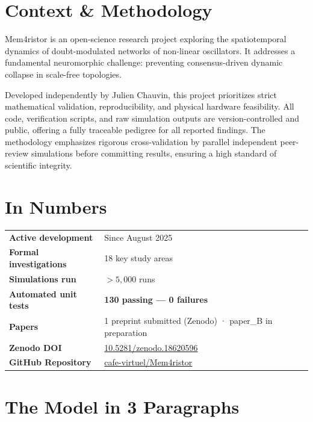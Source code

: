 \documentclass[11pt, a4paper]{article}
\newcommand{\result}[1]{\textbf{\color{positive}#1}}
\begin{document}
\section{Context \& Methodology}

Mem4ristor is an open-science research project exploring the spatiotemporal dynamics of doubt-modulated networks of non-linear oscillators. It addresses a fundamental neuromorphic challenge: preventing consensus-driven dynamic collapse in scale-free topologies.

Developed independently by Julien Chauvin, this project prioritizes strict mathematical validation, reproducibility, and physical hardware feasibility. All code, verification scripts, and raw simulation outputs are version-controlled and public, offering a fully traceable pedigree for all reported findings. The methodology emphasizes rigorous cross-validation by parallel independent peer-review simulations before committing results, ensuring a high standard of scientific integrity.

\section{In Numbers}

\begin{center}
\renewcommand{\arraystretch}{1.25}
\begin{tabular}{p{4.5cm} p{9cm}}
\toprule
\textbf{Active development} & Since August 2025 \\
\textbf{Formal investigations} & 18 key study areas \\
\textbf{Simulations run} & $> 5{,}000$ runs \\
\textbf{Automated unit tests} & \result{130 passing --- 0 failures} \\
\textbf{Papers} & 1 preprint submitted (Zenodo) · paper\_B in preparation \\
\textbf{Zenodo DOI} & \href{https://doi.org/10.5281/zenodo.18620596}{10.5281/zenodo.18620596} \\
\textbf{GitHub Repository} & \href{https://github.com/cafe-virtuel/Mem4ristor}{cafe-virtuel/Mem4ristor} \\
\bottomrule
\end{tabular}
\end{center}

\section{The Model in 3 Paragraphs}
\end{document}

